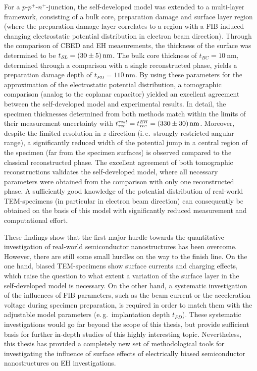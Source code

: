 For a $p$-$p^+$-$n^+$-junction, the self-developed model was extended to a multi-layer framework, consisting of a bulk core, preparation damage and surface layer region (where the preparation damage layer correlates to a region with a FIB-induced changing electrostatic potential distribution in electron beam direction). Through the comparison of CBED and EH measurements, the thickness of the surface was determined to be $t_{\mathit{SL}} = \SI{30 \pm 5}{\nm}$. The bulk core thickness of $t_{\mathit{BC}} = \SI{10}{\nm}$, determined through a comparison with a single reconstructed phase, yields a preparation damage depth of $t_{\mathit{PD}} = \SI{110}{\nm}$. By using these parameters for the approximation of the electrostatic potential distribution, a tomographic comparison (analog to the coplanar capacitor) yielded an excellent agreement between the self-developed model and experimental results. In detail, the specimen thicknesses determined from both methods match within the limits of their measurement uncertainty with $t_{\mathit{rec}}^{\mathit{rest}} = t_{\mathit{rec}}^{\mathit{EH}} = \SI{330 \pm 30}{\nm}$. Moreover, despite the limited resolution in $z$-direction (i.\,e.\ strongly restricted angular range), a significantly reduced width of the potential jump in a central region of the specimen (far from the specimen surfaces) is observed compared to the classical reconstructed phase. The excellent agreement of both tomographic reconstructions validates the self-developed model, where all necessary parameters were obtained from the comparison with only one reconstructed phase. A sufficiently good knowledge of the potential distribution of real-world TEM-specimens (in particular in electron beam direction) can consequently be obtained on the basis of this model with significantly reduced measurement and computational effort.

These findings show that the first major hurdle towards the quantitative investigation of real-world semiconductor nanostructures has been overcome. However, there are still some small hurdles on the way to the finish line. On the one hand, biased TEM-specimens show surface currents and charging effects, which raise the question to what extent a variation of the surface layer in the self-developed model is necessary. On the other hand, a systematic investigation of the influences of FIB parameters, such as the beam current or the acceleration voltage during specimen preparation, is required in order to match them with the adjustable model parameters (e.\,g.\ implantation depth $t_{\mathit{PD}}$). These systematic investigations would go far beyond the scope of this thesis, but provide sufficient basis for further in-depth studies of this highly interesting topic. Nevertheless, this thesis has provided a completely new set of methodological tools for investigating the influence of surface effects of electrically biased semiconductor nanostructures on EH investigations.
